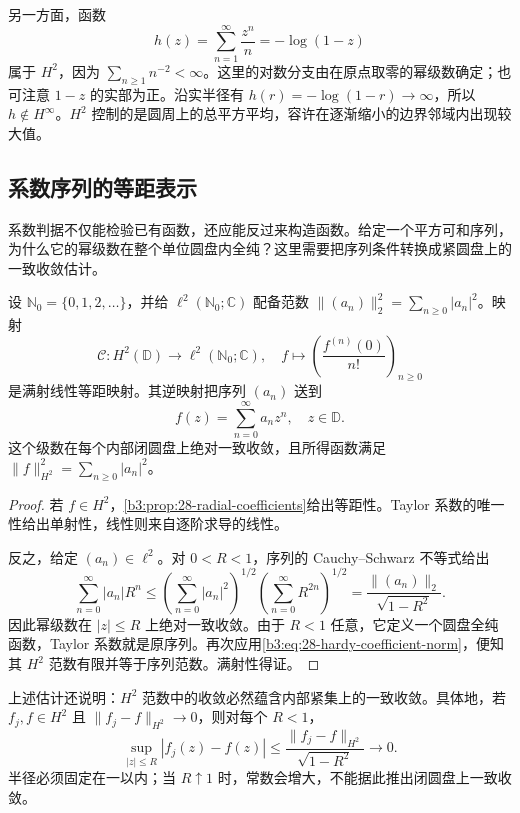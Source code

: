 \ProseParagraphBreak
另一方面，函数
\[
 h(z)=\sum_{n=1}^{\infty}\frac{z^n}{n}=-\log(1-z)
\]
属于 \(H^2\)，因为 \(\sum_{n\ge1}n^{-2}<\infty\)。这里的对数分支由在原点取零的幂级数确定；也可注意 \(1-z\) 的实部为正。沿实半径有 \(h(r)=-\log(1-r)\to\infty\)，所以 \(h\notin H^\infty\)。\(H^2\) 控制的是圆周上的总平方平均，容许在逐渐缩小的边界邻域内出现较大值。

\subsection{系数序列的等距表示}
\label{b3:subsec:280103}

系数判据不仅能检验已有函数，还应能反过来构造函数。给定一个平方可和序列，为什么它的幂级数在整个单位圆盘内全纯？这里需要把序列条件转换成紧圆盘上的一致收敛估计。

\begin{theorem}\label{b3:thm:28-hardy-coefficients}
设 \(\mathbb N_0=\{0,1,2,\ldots\}\)，并给 \(\ell^2(\mathbb N_0;\mathbb C)\) 配备范数 \(\|(a_n)\|_2^2=\sum_{n\ge0}|a_n|^2\)。映射
\[
 \mathcal C:H^2(\mathbb D)\longrightarrow\ell^2(\mathbb N_0;\mathbb C),
 \quad f\longmapsto\left(\frac{f^{(n)}(0)}{n!}\right)_{n\ge0}
\]
是满射线性等距映射。其逆映射把序列 \((a_n)\) 送到
\[
 f(z)=\sum_{n=0}^{\infty}a_nz^n,
 \quad z\in\mathbb D.
\]
这个级数在每个内部闭圆盘上绝对一致收敛，且所得函数满足 \(\|f\|_{H^2}^2=\sum_{n\ge0}|a_n|^2\)。
\end{theorem}
\begin{proof}
若 \(f\in H^2\)，\cref{b3:prop:28-radial-coefficients}给出等距性。Taylor 系数的唯一性给出单射性，线性则来自逐阶求导的线性。

反之，给定 \((a_n)\in\ell^2\)。对 \(0<R<1\)，序列的 Cauchy--Schwarz 不等式给出
\[
 \sum_{n=0}^{\infty}|a_n|R^n
 \le\left(\sum_{n=0}^{\infty}|a_n|^2\right)^{1/2}
      \left(\sum_{n=0}^{\infty}R^{2n}\right)^{1/2}
 =\frac{\|(a_n)\|_2}{\sqrt{1-R^2}}.
\]
因此幂级数在 \(|z|\le R\) 上绝对一致收敛。由于 \(R<1\) 任意，它定义一个圆盘全纯函数，Taylor 系数就是原序列。再次应用\eqref{b3:eq:28-hardy-coefficient-norm}，便知其 \(H^2\) 范数有限并等于序列范数。满射性得证。
\end{proof}

上述估计还说明：\(H^2\) 范数中的收敛必然蕴含内部紧集上的一致收敛。具体地，若 \(f_j,f\in H^2\) 且 \(\|f_j-f\|_{H^2}\to0\)，则对每个 \(R<1\)，
\begin{equation}\label{b3:eq:28-hardy-compact-control}
 \sup_{|z|\le R}|f_j(z)-f(z)|
 \le\frac{\|f_j-f\|_{H^2}}{\sqrt{1-R^2}}
 \longrightarrow0.
\end{equation}
半径必须固定在一以内；当 \(R\uparrow1\) 时，常数会增大，不能据此推出闭圆盘上一致收敛。

